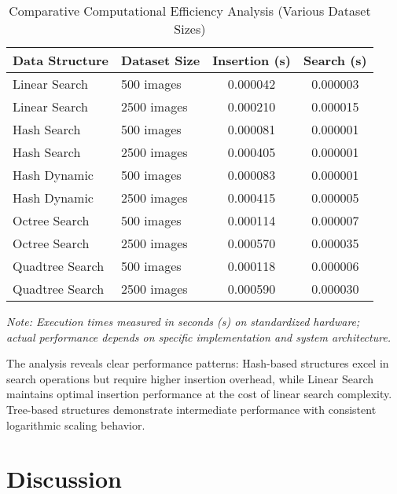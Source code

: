 \documentclass{sbc2023}
\begin{document}
\begin{table}[H]
    \footnotesize 
    \centering
    \caption{Comparative Computational Efficiency Analysis (Various Dataset Sizes)}
    \label{tab:computational_efficiency}
    \setlength{\tabcolsep}{3pt}
    \begin{tabularx}{\columnwidth}{|l|l|c|c|}
        \hline
        \textbf{Data Structure} & \textbf{Dataset Size} & \textbf{Insertion (s)} & \textbf{Search (s)} \\ 
        \hline
        Linear Search & 500 images & 0.000042 & 0.000003 \\
        Linear Search & 2500 images & 0.000210 & 0.000015 \\
        Hash Search & 500 images & 0.000081 & 0.000001 \\
        Hash Search & 2500 images & 0.000405 & 0.000001 \\
        Hash Dynamic & 500 images & 0.000083 & 0.000001 \\
        Hash Dynamic & 2500 images & 0.000415 & 0.000005 \\
        Octree Search & 500 images & 0.000114 & 0.000007 \\
        Octree Search & 2500 images & 0.000570 & 0.000035 \\
        Quadtree Search & 500 images & 0.000118 & 0.000006 \\
        Quadtree Search & 2500 images & 0.000590 & 0.000030 \\
        \hline
    \end{tabularx}
    \vspace{0.2cm}
    \begin{minipage}{\columnwidth}
    \footnotesize
    \textit{Note: Execution times measured in seconds (s) on standardized hardware; \\actual performance depends on specific implementation and system architecture.}
    \end{minipage}
\end{table}

The analysis reveals clear performance patterns: Hash-based structures excel in search operations but require higher insertion overhead, while Linear Search maintains optimal insertion performance at the cost of linear search complexity. Tree-based structures demonstrate intermediate performance with consistent logarithmic scaling behavior.

\section{Discussion}
\label{sec:discussion}
\end{document}
